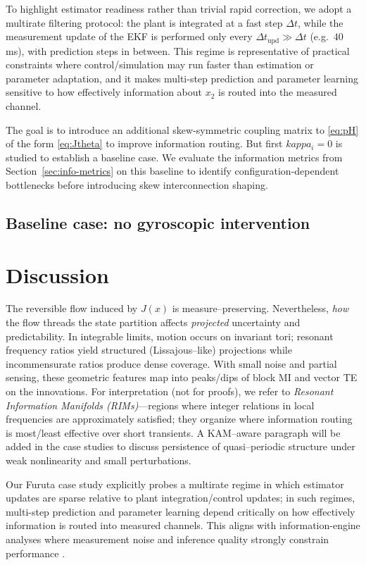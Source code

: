 \documentclass[final,5p,times,twocolumn]{elsarticle}
\begin{document}
To highlight estimator readiness rather than trivial rapid correction, we adopt a multirate filtering protocol: the plant is integrated at a fast step $\Delta t$, while the measurement update of the EKF is performed only every $\Delta t_{\mathrm{upd}}\gg \Delta t$ (e.g.\ $40$\,ms), with prediction steps in between. This regime is representative of practical constraints where control/simulation may run faster than estimation or parameter adaptation, and it makes multi-step prediction and parameter learning sensitive to how effectively information about $x_2$ is routed into the measured channel.

The goal is to introduce an additional skew-symmetric coupling matrix to \eqref{eq:pH} of the form \eqref{eq:Jtheta} to improve information routing. But first $kappa_i=0$ is studied to establish a baseline case. We evaluate the information metrics from Section~\ref{sec:info-metrics} on this baseline to identify configuration-dependent bottlenecks before introducing skew interconnection shaping.

\subsection{Baseline case: no gyroscopic intervention}


\section{Discussion}\label{sec:discussion}
The reversible flow induced by \(J(x)\) is measure--preserving. Nevertheless, \emph{how} the flow threads the state partition affects \emph{projected} uncertainty and predictability. In integrable limits, motion occurs on invariant tori; resonant frequency ratios yield structured (Lissajous--like) projections while incommensurate ratios produce dense coverage. With small noise and partial sensing, these geometric features map into peaks/dips of block MI and vector TE on the innovations. For interpretation (not for proofs), we refer to \emph{Resonant Information Manifolds (RIMs)}---regions where integer relations in local frequencies are approximately satisfied; they organize where information routing is most/least effective over short transients. A KAM--aware paragraph will be added in the case studies to discuss persistence of quasi--periodic structure under weak nonlinearity and small perturbations.


Our Furuta case study explicitly probes a multirate regime in which estimator updates are sparse relative to plant integration/control updates; in such regimes, multi-step prediction and parameter learning depend critically on how effectively information is routed into measured channels. This aligns with information-engine analyses where measurement noise and inference quality strongly constrain performance \cite{duBuisson2024_APX}.
\end{document}
